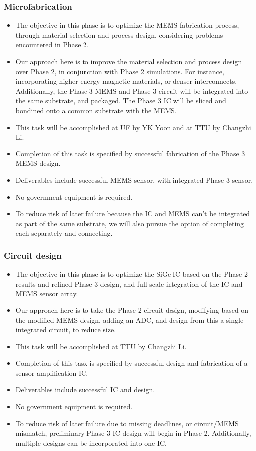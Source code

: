 \subsubsection{Microfabrication}\label{sec:p3:mf}
\begin{itemize}
\item The objective in this phase is to optimize the MEMS fabrication process, through material selection and process design, considering problems encountered in Phase 2.
\item Our approach here is to improve the material selection and process design over Phase 2, in conjunction with Phase 2 simulations. For instance, incorporating higher-energy magnetic materials, or denser interconnects. Additionally, the Phase 3 MEMS and Phase 3 circuit will be integrated into the same substrate, and packaged. The Phase 3 IC will be sliced and bondined onto a common substrate with the MEMS.
\item This task will be accomplished at UF by YK Yoon and at TTU by Changzhi Li.
\item Completion of this task is specified by successful fabrication of the Phase 3 MEMS design.
\item Deliverables include successful MEMS sensor, with integrated Phase 3 sensor.
\item No government equipment is required.
\item To reduce risk of later failure because the IC and MEMS can't be integrated as part of the same substrate, we will also pursue the option of completing each separately and connecting. 
\end{itemize}
\subsubsection{Circuit design}\label{sec:p3:cir}
\begin{itemize}
\item The objective in this phase is to optimize the SiGe IC based on the Phase 2 results and refined Phase 3 design, and full-scale integration of the IC and MEMS sensor array.
\item Our approach here is to take the Phase 2 circuit design, modifying based on the modified MEMS design, adding an ADC,  and design from this a single integrated circuit, to reduce size. 
\item This task will be accomplished at TTU by Changzhi Li.
\item Completion of this task is specified by successful design and fabrication of a sensor amplification IC.
\item Deliverables include successful IC and design.
\item No government equipment is required.
\item To reduce risk of later failure due to missing deadlines, or circuit/MEMS mismatch, preliminary Phase 3 IC design will begin in Phase 2. Additionally, multiple designs can be incorporated into one IC.
\end{itemize}  
